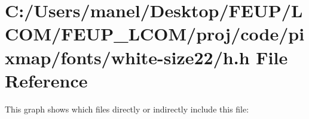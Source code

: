 \hypertarget{white-size22_2h_8h}{}\section{C\+:/\+Users/manel/\+Desktop/\+F\+E\+U\+P/\+L\+C\+O\+M/\+F\+E\+U\+P\+\_\+\+L\+C\+O\+M/proj/code/pixmap/fonts/white-\/size22/h.h File Reference}
\label{white-size22_2h_8h}
This graph shows which files directly or indirectly include this file\+:
